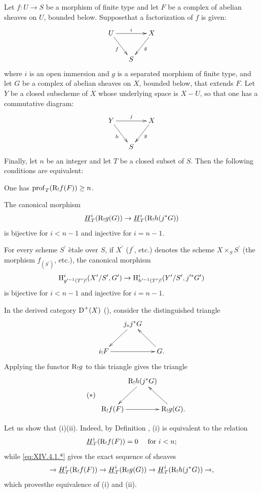 \begin{proposition} \label{XIV.4.1} Let $f\colon U\to S$ be a morphism of finite type and let $F$ be a complex of abelian sheaves on $U$, bounded below. Suppose\pageoriginale that a factorization of $f$ is given:
$$
\xymatrix@C=15pt{ U\ar[rr]^-{i}\ar[rd]_-{f} & & X\ar[ld]^-{g}\\
& S & }$$
where $i$ is an open immersion and $g$ is a separated morphism of finite type, and let $G$ be a complex of abelian sheaves on $X$, bounded below, that extends $F$. Let $Y$ be a closed subscheme of $X$ whose underlying space is $X-U$, so that one has a commutative diagram:
$$
\xymatrix@C=15pt{ Y\ar[rr]^-{j}\ar[rd]_-{h} & & X\ar[ld]^-{g}\\
& S & }$$
Finally, let $n$ be an integer and let $T$ be a closed subset of $S$. Then the following conditions are equivalent:
\begin{enumeratei}
\item
One has $\operatorname{prof}_{T}(\mathrm R_{!}f(F))\geq n$.
\item
The canonical morphism
$$
\underline{H}_{T}^{i}(\mathrm R_{!}g(G))\to\underline{H}_{T}^{i}(\mathrm R_{!}h(j^{\ast}G))
$$
is bijective for $i<n-1$ and injective for $i=n-1$.
\item
For every scheme $S^{\prime}$ \`etale over $S$, if $X^{\prime}$ (\resp $f^{\prime}$, \resp etc.) denotes the scheme $X\times_{S}S^{\prime}$ (\resp the morphism $f_{(S^{\prime})}$, \resp etc.), the canonical morphism\pageoriginale
$$
\mathrm H_{g^{\prime -1}(T^{\prime})!}^{i}(X^{\prime}/S^{\prime}, G^{\prime})\to\mathrm H_{h^{\prime -1}(T^{\prime})!}^{i}(Y^{\prime}/S^{\prime}, j^{\prime\ast}G^{\prime})
$$
is bijective for $i<n-1$ and injective for $i=n-1$.
\end{enumeratei}
\end{proposition}

In the derived category $\operatorname{D}^{+}(X)$ (\cf \cite{XIV.3}), consider the distinguished triangle
$$
\xymatrix@C=15pt{ & j_{\ast}j^{\ast}G\ar[ld] & \\
i_{!}F\ar[rr] & & G.\ar[lu]}$$
Applying the functor $\mathrm R_{!}g$ to this triangle gives the triangle
\begin{equation*} \label{eq:XIV.4.1.*} \tag{$*$}
\begin{array}{c}
\xymatrix@C=0pt{
& \R_{!}h(j^{\ast}G)\ar[ld] & \\
\R_{!}f(F)\ar[rr] & & \R_{!}g(G).\ar[lu]
}
\end{array}
\end{equation*}

Let us show that \textup{(i)}\SSI\textup{(ii)}. Indeed, by Definition , \textup{(i)} is equivalent to the relation
$$
\underline{H}_{T}^{i}(\mathrm R_{!}f(F))=0\quad\textrm{ for }i<n\textrm{;}$$
while \eqref{eq:XIV.4.1.*} gives the exact sequence of sheaves
$$
\to\underline{H}_{T}^{i}(\mathrm R_{!}f(F))\to\underline{H}_{T}^{i}(\mathrm R_{!}g(G))\to\underline{H}_{T}^{i}(\mathrm R_{!}h(j^{\ast}G))\to,
$$
which proves\pageoriginale the equivalence of \textup{(i)} and \textup{(ii)}.

